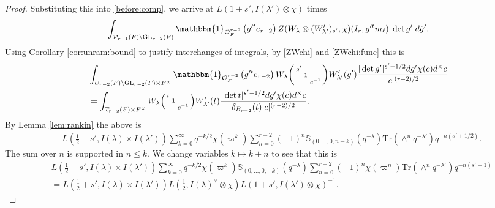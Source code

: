 \documentclass[12pt]{amsart}
\theoremstyle{remark}
\numberwithin{equation}{section}
\newcommand{\GL}{\mathrm{GL}}
\newcommand{\OO}{\mathcal{O}}
\theoremstyle{definition}
\newenvironment{psmatrix}
  {\left(\begin{smallmatrix}}
  {\end{smallmatrix}\right)}
\numberwithin{equation}{subsection}
\newcommand{\one}{\mathbbm{1}}
\begin{document}
\begin{proof}
Substituting this into \eqref{before:comp}, we arrive at $L(1+s',I(\lambda')\otimes\chi)$ times
\begin{align*} 
\int_{\mathcal{P}_{r-1}(F) \backslash \GL_{r-2}(F)}
\one_{\OO_F^{r-2}}\left(g'^te_{r-2}\right)Z(W_\lambda\otimes (W'_{\lambda'})_{s'},\chi)(I_r,g'^tm_\ell)|\det g'|d\dot{g}'.
\end{align*}
Using Corollary \ref{cor:unram:bound} to justify interchanges of integrals, by \eqref{ZWchi} and \eqref{ZWchi:func} this is
\begin{align*}
&\int_{U_{r-2}(F) \backslash \GL_{r-2}(F) \times F^\times} \one_{\OO_F^{r-2}}\left(g'^te_{r-2}\right)W_\lambda\begin{psmatrix}g' & & \\ &   1 & \\ && c^{-1} \end{psmatrix}W_{\lambda'}'(g')  \frac{|\det g'|^{s'-1/2}dg' \chi(c)d^\times c}{|c|^{(r-2)/2}}\\&=
    \int_{T_{r-2}(F) \times F^\times}W_\lambda\begin{psmatrix}t & & \\ &   1 & \\ && c^{-1} \end{psmatrix}W_{\lambda'}'(t)  \frac{|\det t|^{s'-1/2}dg' \chi(c)d^\times c}{\delta_{B_{r-2}}(t)|c|^{(r-2)/2}}.
\end{align*}
By Lemma \ref{lem:rankin} the above is 
\begin{align*}
    & L\left(\tfrac{1}{2}+s',I(\lambda) \times I(\lambda')\right) \sum_{k=0}^{\infty} q^{-k/2}\chi(\varpi^{k})\sum_{n=0}^{r-2} (-1)^n\mathbb{S}_{(0,\dots,0, n-k)}(q^{-\lambda})\mathrm{Tr}(\wedge^n q^{-\lambda'})q^{-n(s'+1/2)}.  
\end{align*}
The sum over $n$ is supported in $n \leq k.$  We change variables $k \mapsto k+n$ to see that this is 
\begin{align*}
   & L\left(\tfrac{1}{2}+s',I(\lambda) \times I(\lambda')\right) \sum_{k=0}^{\infty} q^{-k/2}\chi(\varpi^{k})\mathbb{S}_{(0,\dots,0, -k)}(q^{-\lambda})\sum_{n=0}^{r-2} (-1)^n\chi(\varpi^n)\mathrm{Tr}(\wedge^n q^{-\lambda'})q^{-n(s'+1)}  
  \\
    & = L\left(\tfrac{1}{2}+s',I(\lambda) \times I(\lambda')\right) L\left(\tfrac{1}{2}, I(\lambda)^{\vee}\otimes \chi\right)L\left(1+s',I(\lambda') \otimes \chi\right)^{-1}.
\end{align*}
\end{proof}
\end{document}
